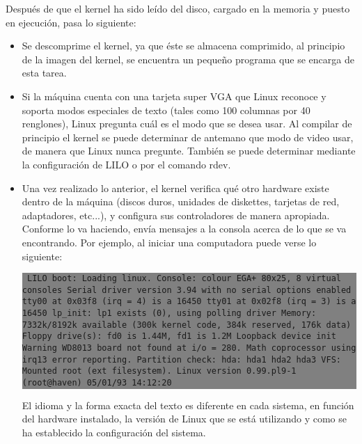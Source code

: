 \documentclass[12pt]{article}
\begin{document}
 Después de que el kernel ha sido leído del disco, cargado en la memoria y
puesto en ejecución, pasa lo siguiente: \begin{itemize}

	\item{

Se descomprime el kernel, ya que éste se almacena comprimido, al principio de la
imagen del kernel, se encuentra un pequeño programa que se encarga de esta
tarea.  }

	\item{

Si la máquina cuenta con una tarjeta super VGA que Linux reconoce y soporta
modos especiales de texto (tales como 100 columnas por 40 renglones), Linux
pregunta cuál es el modo que se desea usar. Al compilar de principio el kernel
se puede determinar de antemano que modo de video usar, de manera que Linux
nunca pregunte. También se puede determinar mediante la configuración de LILO o
por el comando rdev.  }

	\item{

Una vez realizado lo anterior, el kernel verifica qué otro hardware existe
dentro de la máquina (discos duros, unidades de diskettes, tarjetas de red,
adaptadores, etc...), y configura sus controladores de manera apropiada.
Conforme lo va haciendo, envía mensajes a la consola acerca de lo que se va
encontrando. Por ejemplo, al iniciar una computadora puede verse lo siguiente:

  
   


\colorbox{grey}{\parbox[t]{0.95\linewidth}{ \vspace*{0.5cm} {\tt 
LILO boot:
Loading linux.
Console: colour EGA+ 80x25, 8 virtual consoles
Serial driver version 3.94 with no serial options enabled
tty00 at 0x03f8 (irq = 4) is a 16450
tty01 at 0x02f8 (irq = 3) is a 16450
lp_init: lp1 exists (0), using polling driver
Memory: 7332k/8192k available (300k kernel code, 384k reserved, 176k
data)
Floppy drive(s): fd0 is 1.44M, fd1 is 1.2M
Loopback device init
Warning WD8013 board not found at i/o = 280.
Math coprocessor using irq13 error reporting.
Partition check:
  hda: hda1 hda2 hda3
VFS: Mounted root (ext filesystem).
Linux version 0.99.pl9-1 (root@haven) 05/01/93 14:12:20
 } \vspace*{0.5cm} } } 




El idioma y la forma exacta del texto es diferente en cada sistema, en función
del hardware instalado, la versión de Linux que se está utilizando y como se ha
establecido la configuración del sistema.  }


\end{itemize}
\end{document}
